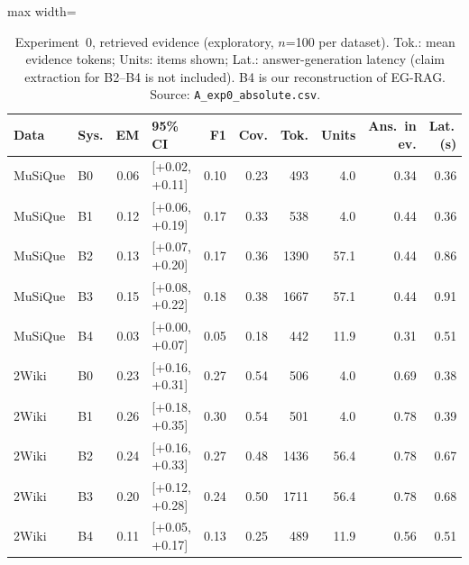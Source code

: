 \begin{table}[t]
\centering
\footnotesize
\begin{adjustbox}{max width=\linewidth}
\begin{tabular}{@{}llrlrrrrrr@{}}
\toprule
Data & Sys. & EM & 95\% CI & F1 & Cov. & Tok. & Units & Ans.\ in ev. & Lat.\,(s) \\
\midrule
MuSiQue & B0 & 0.06 & [+0.02, +0.11] & 0.10 & 0.23 & 493 & 4.0 & 0.34 & 0.36 \\
MuSiQue & B1 & 0.12 & [+0.06, +0.19] & 0.17 & 0.33 & 538 & 4.0 & 0.44 & 0.36 \\
MuSiQue & B2 & 0.13 & [+0.07, +0.20] & 0.17 & 0.36 & 1390 & 57.1 & 0.44 & 0.86 \\
MuSiQue & B3 & 0.15 & [+0.08, +0.22] & 0.18 & 0.38 & 1667 & 57.1 & 0.44 & 0.91 \\
MuSiQue & B4 & 0.03 & [+0.00, +0.07] & 0.05 & 0.18 & 442 & 11.9 & 0.31 & 0.51 \\
\midrule
2Wiki & B0 & 0.23 & [+0.16, +0.31] & 0.27 & 0.54 & 506 & 4.0 & 0.69 & 0.38 \\
2Wiki & B1 & 0.26 & [+0.18, +0.35] & 0.30 & 0.54 & 501 & 4.0 & 0.78 & 0.39 \\
2Wiki & B2 & 0.24 & [+0.16, +0.33] & 0.27 & 0.48 & 1436 & 56.4 & 0.78 & 0.67 \\
2Wiki & B3 & 0.20 & [+0.12, +0.28] & 0.24 & 0.50 & 1711 & 56.4 & 0.78 & 0.68 \\
2Wiki & B4 & 0.11 & [+0.05, +0.17] & 0.13 & 0.25 & 489 & 11.9 & 0.56 & 0.51 \\
\bottomrule
\end{tabular}
\end{adjustbox}
\caption{Experiment~0, retrieved evidence (exploratory, $n$=100 per dataset). Tok.: mean evidence tokens; Units: items shown; Lat.: answer-generation latency (claim extraction for B2--B4 is not included). B4 is our reconstruction of EG-RAG. Source: \texttt{A\_exp0\_absolute.csv}.}
\label{tab:exp0}
\end{table}
